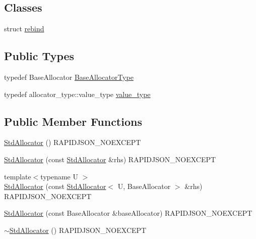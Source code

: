 \subsection*{Classes}
\begin{DoxyCompactItemize}
\item 
struct \hyperlink{structStdAllocator_3_01void_00_01BaseAllocator_01_4_1_1rebind}{rebind}
\end{DoxyCompactItemize}
\subsection*{Public Types}
\begin{DoxyCompactItemize}
\item 
typedef Base\+Allocator \hyperlink{classStdAllocator_3_01void_00_01BaseAllocator_01_4_a72dfb6c478f475a31ef99be2fbe9332f}{Base\+Allocator\+Type}
\item 
typedef allocator\+\_\+type\+::value\+\_\+type \hyperlink{classStdAllocator_3_01void_00_01BaseAllocator_01_4_a1df4e2d5cfdec13a30e19fa73507c542}{value\+\_\+type}
\end{DoxyCompactItemize}
\subsection*{Public Member Functions}
\begin{DoxyCompactItemize}
\item 
\hyperlink{classStdAllocator_3_01void_00_01BaseAllocator_01_4_ae04f7a523d5d80dde6ce700e2807ff27}{Std\+Allocator} () R\+A\+P\+I\+D\+J\+S\+O\+N\+\_\+\+N\+O\+E\+X\+C\+E\+PT
\item 
\hyperlink{classStdAllocator_3_01void_00_01BaseAllocator_01_4_ab7d8af9c46aaee8e3e2c60b95b1d595d}{Std\+Allocator} (const \hyperlink{classStdAllocator}{Std\+Allocator} \&rhs) R\+A\+P\+I\+D\+J\+S\+O\+N\+\_\+\+N\+O\+E\+X\+C\+E\+PT
\item 
{\footnotesize template$<$typename U $>$ }\\\hyperlink{classStdAllocator_3_01void_00_01BaseAllocator_01_4_a47cf6d8a7f37c6f1c03c158948d88553}{Std\+Allocator} (const \hyperlink{classStdAllocator}{Std\+Allocator}$<$ U, Base\+Allocator $>$ \&rhs) R\+A\+P\+I\+D\+J\+S\+O\+N\+\_\+\+N\+O\+E\+X\+C\+E\+PT
\item 
\hyperlink{classStdAllocator_3_01void_00_01BaseAllocator_01_4_a8ee693f821d2a7209947faab4a77e304}{Std\+Allocator} (const Base\+Allocator \&base\+Allocator) R\+A\+P\+I\+D\+J\+S\+O\+N\+\_\+\+N\+O\+E\+X\+C\+E\+PT
\item 
\hyperlink{classStdAllocator_3_01void_00_01BaseAllocator_01_4_a223afcc6a4765478ca3c89f1164913d4}{$\sim$\+Std\+Allocator} () R\+A\+P\+I\+D\+J\+S\+O\+N\+\_\+\+N\+O\+E\+X\+C\+E\+PT
\end{DoxyCompactItemize}

